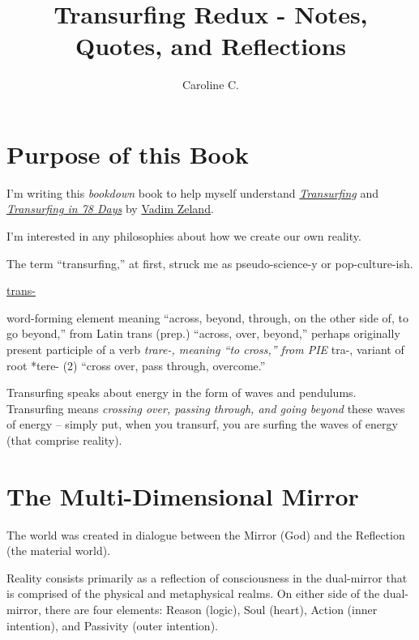 \documentclass[
  openany]{book}
\title{Transurfing Redux - Notes, Quotes, and Reflections}
\author{Caroline C.}
\date{}
\begin{document}
\maketitle

{
\setcounter{tocdepth}{1}
\tableofcontents
}
\hypertarget{purpose-of-this-book}{%
\chapter{Purpose of this Book}\label{purpose-of-this-book}}

I'm writing this \emph{bookdown} book to help myself understand \href{https://www.amazon.com/Reality-transurfing-Steps-Vadim-Zeland/dp/1532814658}{\emph{Transurfing}} and \href{https://www.amazon.com/Transurfing-78-Days-Practical-Creating/dp/5957334715/ref=pd_lpo_1?pd_rd_i=5957334715\&psc=1}{\emph{Transurfing in 78 Days}} by \href{https://www.amazon.com/Vadim-Zeland/e/B00J0SESMY/ref=dp_byline_cont_pop_book_1}{Vadim Zeland}.

I'm interested in any philosophies about how we create our own reality.

The term ``transurfing,'' at first, struck me as pseudo-science-y or pop-culture-ish.

\href{https://www.etymonline.com/word/trans-}{trans-}

word-forming element meaning ``across, beyond, through, on the other side of, to go beyond,'' from Latin trans (prep.) ``across, over, beyond,'' perhaps originally present participle of a verb \emph{trare-, meaning ``to cross,'' from PIE }tra-, variant of root *tere- (2) ``cross over, pass through, overcome.''

Transurfing speaks about energy in the form of waves and pendulums. Transurfing means \emph{crossing over, passing through, and going beyond} these waves of energy -- simply put, when you transurf, you are surfing the waves of energy (that comprise reality).

\hypertarget{the-multi-dimensional-mirror}{%
\chapter{The Multi-Dimensional Mirror}\label{the-multi-dimensional-mirror}}

The world was created in dialogue between the Mirror (God) and the Reflection (the material world).

Reality consists primarily as a reflection of consciousness in the dual-mirror that is comprised of the physical and metaphysical realms. On either side of the dual-mirror, there are four elements: Reason (logic), Soul (heart), Action (inner intention), and Passivity (outer intention).
\end{document}
